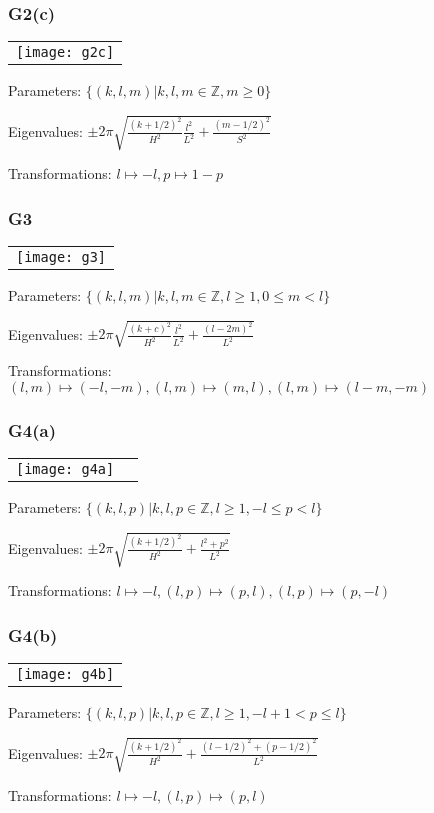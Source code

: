 \documentclass{beamer}
\def\Z{{\mathbb Z}}
\begin{document}
\begin{frame}
\frametitle{G2(c)}
    \begin{tabular}[]{l}
\texttt{[image: g2c]}\\
    \end{tabular}

    \begin{block}{}
      Parameters: $\{(k,l,m)| k,l,m \in \Z, m \geq 0\}$

      Eigenvalues: $\pm 2\pi\sqrt{\frac{(k+1/2)^2}{H^2}\frac{l^2}{L^2} + \frac{(m-1/2)^2}{S^2}}$
      
      Transformations: $l \mapsto -l, p \mapsto 1-p$
    \end{block}
\end{frame}

\begin{frame}
  \frametitle{G3}
    \begin{tabular}[]{l}
\texttt{[image: g3]}\\
    \end{tabular}
    \begin{block}{}
      Parameters: $\{(k,l,m)| k,l,m \in \Z, l \geq 1, 0 \leq m < l\}$

      Eigenvalues: $\pm 2\pi\sqrt{\frac{(k+c)^2}{H^2}\frac{l^2}{L^2} + \frac{(l - 2m)^2}{L^2}}$
      
      Transformations: $(l,m) \mapsto (-l,-m), (l,m) \mapsto (m,l), (l,m) \mapsto(l-m,-m)$
    \end{block}
\end{frame}

\begin{frame}
  \frametitle{G4(a)}
    \begin{tabular}[]{lr}
	\texttt{[image: g4a]}\\
    \end{tabular}
    \begin{block}{}
      Parameters: $\{(k,l,p)| k,l,p \in \Z, l \geq 1, -l \leq p < l\}$

      Eigenvalues: $\pm 2\pi\sqrt{\frac{(k+1/2)^2}{H^2} + \frac{l^2 + p^2}{L^2}}$
      
      Transformations: $l \mapsto -l, (l,p) \mapsto (p,l), (l,p)\mapsto(p,-l)$
    \end{block}
\end{frame}

\begin{frame}
    \frametitle{G4(b)}
    \begin{tabular}[]{l}
	\texttt{[image: g4b]}\\
    \end{tabular}

    \begin{block}{}
      Parameters: $\{(k,l,p)| k,l,p \in \Z, l \geq 1, -l + 1 < p \leq l\}$

      Eigenvalues: $\pm 2\pi\sqrt{\frac{(k+1/2)^2}{H^2} + \frac{(l-1/2)^2 + (p - 1/2)^2}{L^2}}$
      
      Transformations: $l \mapsto -l, (l,p) \mapsto (p,l)$
    \end{block}

\end{frame}
\end{document}
